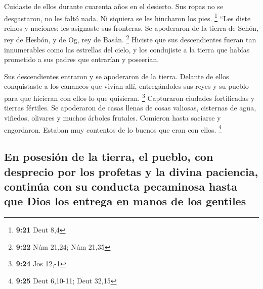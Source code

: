  Cuidaste de ellos durante cuarenta años en el desierto.
Sus ropas no se desgastaron, no les faltó nada. Ni siquiera se les
hincharon los pies. \footnote{\textbf{9:21} Deut 8,4} 
``Les diste reinos y naciones; les asignaste sus fronteras. Se
apoderaron de la tierra de Sehón, rey de Hesbón, y de Og, rey de Basán.
\footnote{\textbf{9:22} Núm 21,24; Núm 21,35}  Hiciste
que sus descendientes fueran tan innumerables como las estrellas del
cielo, y los condujiste a la tierra que habías prometido a sus padres
que entrarían y poseerían.

 Sus descendientes entraron y se apoderaron de la tierra.
Delante de ellos conquistaste a los cananeos que vivían allí,
entregándoles sus reyes y su pueblo para que hicieran con ellos lo que
quisieran. \footnote{\textbf{9:24} Jos 12,-1}  Capturaron
ciudades fortificadas y tierras fértiles. Se apoderaron de casas llenas
de cosas valiosas, cisternas de agua, viñedos, olivares y muchos árboles
frutales. Comieron hasta saciarse y engordaron. Estaban muy contentos de
lo buenos que eran con ellos. \footnote{\textbf{9:25} Deut 6,10-11; Deut
  32,15}

\hypertarget{en-posesiuxf3n-de-la-tierra-el-pueblo-con-desprecio-por-los-profetas-y-la-divina-paciencia-continuxfaa-con-su-conducta-pecaminosa-hasta-que-dios-los-entrega-en-manos-de-los-gentiles}{%
\subsection{En posesión de la tierra, el pueblo, con desprecio por los
profetas y la divina paciencia, continúa con su conducta pecaminosa
hasta que Dios los entrega en manos de los
gentiles}\label{en-posesiuxf3n-de-la-tierra-el-pueblo-con-desprecio-por-los-profetas-y-la-divina-paciencia-continuxfaa-con-su-conducta-pecaminosa-hasta-que-dios-los-entrega-en-manos-de-los-gentiles}}

